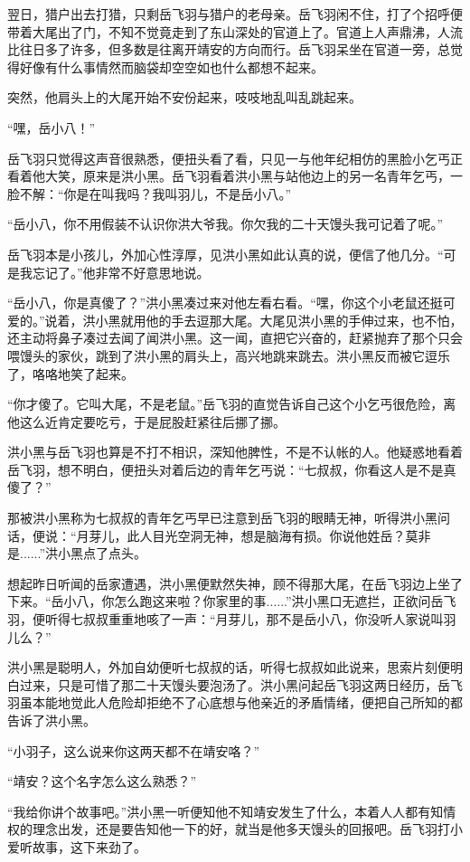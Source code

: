 翌日，猎户出去打猎，只剩岳飞羽与猎户的老母亲。岳飞羽闲不住，打了个招呼便带着大尾出了门，不知不觉竟走到了东山深处的官道上了。官道上人声鼎沸，人流比往日多了许多，但多数是往离开靖安的方向而行。岳飞羽呆坐在官道一旁，总觉得好像有什么事情然而脑袋却空空如也什么都想不起来。

突然，他肩头上的大尾开始不安份起来，吱吱地乱叫乱跳起来。

“嘿，岳小八！”

岳飞羽只觉得这声音很熟悉，便扭头看了看，只见一与他年纪相仿的黑脸小乞丐正看着他大笑，原来是洪小黑。岳飞羽看着洪小黑与站他边上的另一名青年乞丐，一脸不解：“你是在叫我吗？我叫羽儿，不是岳小八。”

“岳小八，你不用假装不认识你洪大爷我。你欠我的二十天馒头我可记着了呢。”

岳飞羽本是小孩儿，外加心性淳厚，见洪小黑如此认真的说，便信了他几分。“可是我忘记了。”他非常不好意思地说。

“岳小八，你是真傻了？”洪小黑凑过来对他左看右看。“嘿，你这个小老鼠还挺可爱的。”说着，洪小黑就用他的手去逗那大尾。大尾见洪小黑的手伸过来，也不怕，还主动将鼻子凑过去闻了闻洪小黑。这一闻，直把它兴奋的，赶紧抛弃了那个只会喂馒头的家伙，跳到了洪小黑的肩头上，高兴地跳来跳去。洪小黑反而被它逗乐了，咯咯地笑了起来。

“你才傻了。它叫大尾，不是老鼠。”岳飞羽的直觉告诉自己这个小乞丐很危险，离他这么近肯定要吃亏，于是屁股赶紧往后挪了挪。

洪小黑与岳飞羽也算是不打不相识，深知他脾性，不是不认帐的人。他疑惑地看着岳飞羽，想不明白，便扭头对着后边的青年乞丐说：“七叔叔，你看这人是不是真傻了？”

那被洪小黑称为七叔叔的青年乞丐早已注意到岳飞羽的眼睛无神，听得洪小黑问话，便说：“月芽儿，此人目光空洞无神，想是脑海有损。你说他姓岳？莫非是......”洪小黑点了点头。

想起昨日听闻的岳家遭遇，洪小黑便默然失神，顾不得那大尾，在岳飞羽边上坐了下来。“岳小八，你怎么跑这来啦？你家里的事......”洪小黑口无遮拦，正欲问岳飞羽，便听得七叔叔重重地咳了一声：“月芽儿，那不是岳小八，你没听人家说叫羽儿么？”

洪小黑是聪明人，外加自幼便听七叔叔的话，听得七叔叔如此说来，思索片刻便明白过来，只是可惜了那二十天馒头要泡汤了。洪小黑问起岳飞羽这两日经历，岳飞羽虽本能地觉此人危险却拒绝不了心底想与他亲近的矛盾情绪，便把自己所知的都告诉了洪小黑。

“小羽子，这么说来你这两天都不在靖安咯？”

“靖安？这个名字怎么这么熟悉？”

“我给你讲个故事吧。”洪小黑一听便知他不知靖安发生了什么，本着人人都有知情权的理念出发，还是要告知他一下的好，就当是他多天馒头的回报吧。岳飞羽打小爱听故事，这下来劲了。

